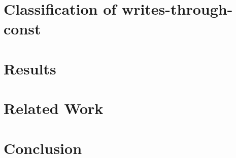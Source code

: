 \documentclass[a4paper, UKenglish]{lipics-v2016}
\newcommand{\const}{{\bfseries \ttfamily const}}
\newcommand{\wstc}{writes-through-\const{}}
\begin{document}
\section{Classification of \wstc{}}
\label{section:classification}


\section{Results}
\label{section:results}


\section{Related Work}
\label{section:related-work}


\section{Conclusion}
\label{section:conclusion}



\end{document}

